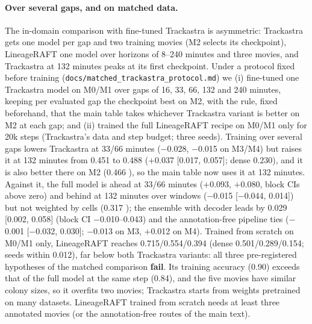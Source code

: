 \documentclass[10pt,twocolumn,letterpaper]{article}
\newcommand{\ours}{LineageRAFT\xspace}
\begin{document}
\paragraph{Over several gaps, and on matched data.}
The in-domain comparison with fine-tuned Trackastra is asymmetric: Trackastra gets one model per gap and two training movies (M2 selects its checkpoint), \ours one model over horizons of 8--240 minutes and three movies, and Trackastra at 132 minutes peaks at its first checkpoint. Under a protocol fixed before training (\texttt{docs/matched\_trackastra\_protocol.md}) we (i) fine-tuned one Trackastra model on M0/M1 over gaps of 16, 33, 66, 132 and 240 minutes, keeping per evaluated gap the checkpoint best on M2, with the rule, fixed beforehand, that the main table takes whichever Trackastra variant is better on M2 at each gap; and (ii) trained the full \ours recipe on M0/M1 only for 20k steps (Trackastra's data and step budget; three seeds). Training over several gaps lowers Trackastra at 33/66 minutes ($-$0.028, $-$0.015 on M3/M4) but raises it at 132 minutes from 0.451 to 0.488 ($+$0.037 [0.017, 0.057]; dense 0.230), and it is also better there on M2 (0.466 ), so the main table now uses it at 132 minutes. Against it, the full model is ahead at 33/66 minutes ($+$0.093, $+$0.080, block CIs above zero) and behind at 132 minutes over windows ($-$0.015 [$-$0.044, 0.014]) but not weighted by cells (0.317 ); the ensemble with decoder leads by 0.029 [0.002, 0.058] (block CI $-$0.010--0.043) and the annotation-free pipeline ties ($-$0.001 [$-$0.032, 0.030]; $-$0.013 on M3, $+$0.012 on M4). Trained from scratch on M0/M1 only, \ours reaches 0.715/0.554/0.394 (dense 0.501/0.289/0.154; seeds within 0.012), far below both Trackastra variants: all three pre-registered hypotheses of the matched comparison \textbf{fail}. Its training accuracy (0.90) exceeds that of the full model at the same step (0.84), and the five movies have similar colony sizes, so it overfits two movies; Trackastra starts from weights pretrained on many datasets. \ours trained from scratch needs at least three annotated movies (or the annotation-free routes of the main text).
\end{document}
